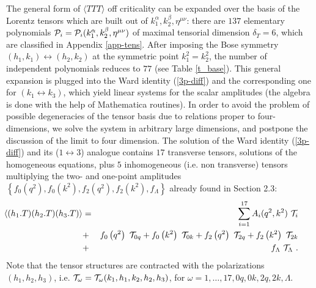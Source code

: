 \documentclass[11pt]{article}
\newcommand{\bea}{\begin{eqnarray}}
\newcommand{\eea}{\end{eqnarray}}
\def\a{\alpha}
\def\b{\beta}
\def\o{\omega}
\def\nl{\nonumber\\}
\def\bh{\!\!\!\!\!\!}
\def\TTT{\bra TTT\ket}
\def\bra{\langle}
\def\ket{\rangle}
\def\dt{{\delta_T}} %
\begin{document}
The general form of $\TTT$ off criticality can be expanded over the
basis of the Lorentz tensors which are built out of 
$k_1^\a,k_2^\b,\eta^{\mu\nu}$:
there are $137$ elementary polynomials
${\cal P}_i={\cal P}_i(k_1^\a,k_2^\b,\eta^{\mu\nu})$  
of maximal tensorial dimension $\dt=6$,
which are classified in Appendix \ref{app-tens}.
After imposing the Bose 
symmetry $(h_1,k_1) \leftrightarrow (h_2,k_2)$ at the symmetric point
$k^2_1=k^2_2$, the number of independent polynomials reduces to $77$
(see Table \ref{t_base}).
This general expansion is plugged into the Ward identity 
(\ref{3p-diff}) and the corresponding one for $(k_1 \leftrightarrow k_3)$, 
which yield linear systems for the scalar amplitudes
(the algebra is done with the help of Mathematica \cite{wolf} routines). 
In order to avoid the problem of possible degeneracies of 
the tensor basis due to relations proper to four-dimensions,
we solve the system in arbitrary large dimensions,
and postpone the discussion of the limit to four dimension. 
The solution of the Ward identity (\ref{3p-diff}) and its 
($1 \leftrightarrow 3$) analogue
contains $17$ transverse tensors, 
solutions of the homogeneous equations, plus $5$ inhomogeneous 
(i.e. non transverse) tensors multiplying the two- and one-point amplitudes
$\left\{ f_0\left(q^2 \right), f_0\left(k^2 \right),
f_2\left(q^2 \right), f_2\left(k^2 \right), f_\Lambda \right\}$
already found in Section 2.3:
\bea\label{3p-cons} 
\bh\bh\bra (h_1.T)(h_2.T)(h_3.T)\ket &=& 
     \sum_{i=1}^{17} A_i(q^2,k^2)\ {\cal T}_i  \nl
     &+& f_0\left(q^2 \right)\ {\cal T}_{0q} + 
         f_0\left(k^2 \right)\ {\cal T}_{0k} 
      +  f_2\left(q^2 \right)\ {\cal T}_{2q} + 
         f_2\left(k^2 \right)\ {\cal T}_{2k} \nl
     &+& f_\Lambda\ {\cal T}_\Lambda \ . 
\eea 
Note that the tensor structures are contracted with 
the polarizations $(h_1,h_2,h_3)$, i.e. 
${\cal T}_\omega ={\cal T}_\omega (k_1,h_1,k_2,h_2,h_3)$,
for $\o=1,\dots,17,0q,0k,2q,2k,\Lambda$.
 
\end{document}
